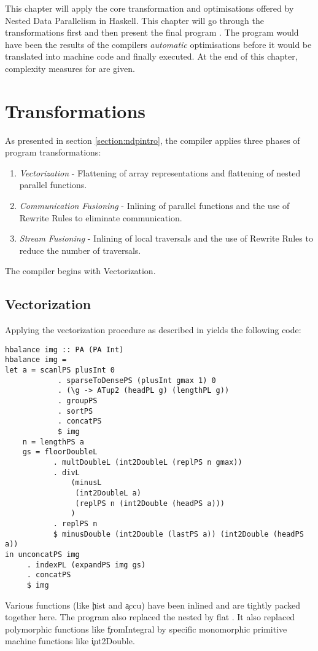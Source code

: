 \label{chapter:ndpv}

This chapter will apply the core transformation and optimisations
offered by Nested Data Parallelism in Haskell.
This chapter will go through the transformations first and then present the
final program \ndpv. The program would have been the results of the compilers \textit{automatic}
optimisations before it would be translated into machine code and finally executed.
At the end of this chapter, complexity measures for \ndpv are given.


\section{Transformations}
  As presented in section \ref{section:ndpintro}, the compiler applies
  three phases of program transformations:
  \begin{enumerate}
    \item \emph{Vectorization} - Flattening of array representations
      and flattening of nested parallel functions.
    \item \emph{Communication Fusioning} - Inlining of parallel
      functions and the use of Rewrite Rules
      to eliminate communication.
    \item \emph{Stream Fusioning} - Inlining of local traversals and
      the use of Rewrite Rules to reduce the number of traversals.
  \end{enumerate}
  
  The compiler begins with Vectorization.
  
  \subsection{Vectorization}
    Applying the vectorization procedure as described in \cite{Harness2008} yields the following code:
    \begin{lstlisting}
hbalance img :: PA (PA Int)
hbalance img = 
let a = scanlPS plusInt 0
            . sparseToDensePS (plusInt gmax 1) 0
            . (\g -> ATup2 (headPL g) (lengthPL g))
            . groupPS
            . sortPS
            . concatPS
            $ img
    n = lengthPS a
    gs = floorDoubleL
           . multDoubleL (int2DoubleL (replPS n gmax))
           . divL
               (minusL
                (int2DoubleL a)
                (replPS n (int2Double (headPS a)))
               )
           . replPS n
           $ minusDouble (int2Double (lastPS a)) (int2Double (headPS a))
in unconcatPS img
     . indexPL (expandPS img gs)
     . concatPS
     $ img
    \end{lstlisting} %
    Various functions (like \c{hist} and \c{accu}) have been inlined and are tightly packed together here.
    The program also replaced the nested \pan by flat \pav.
    It also replaced polymorphic functions like \c{fromIntegral}
    by specific monomorphic primitive machine functions like \c{int2Double}.
    
